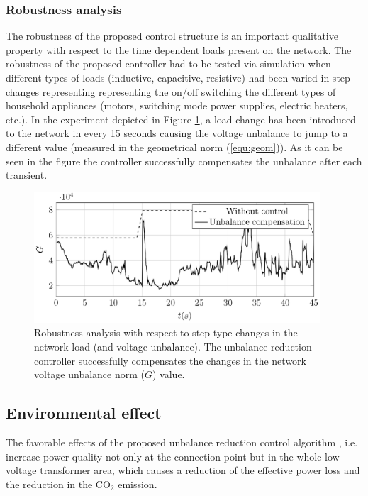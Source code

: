       \subsubsection{Robustness analysis}

            The robustness of the proposed control structure is an important qualitative property with respect to the time dependent loads present on the network. The robustness of the proposed controller had to be tested via simulation when different types of loads (inductive, capacitive, resistive) had been varied in step changes representing representing the on/off switching the different types of household appliances (motors, switching mode power supplies, electric heaters, etc.). In the experiment depicted in Figure \ref{fig:robustness}, a load change has been introduced to the network in every 15 seconds causing the voltage unbalance to jump to a different value (measured in the geometrical norm (\ref{equ:geom})). As it can be seen in the figure the controller successfully compensates the unbalance after each transient.

              \begin{figure}[ht]
            \centering
            \includegraphics[width=0.95\textwidth]{Unblance_EPS_Pics/UnbalRedComp_JCP-figure5.eps}
            \caption{Robustness analysis with respect to step type changes in the network load (and voltage unbalance). The unbalance reduction controller successfully compensates the changes in the network voltage unbalance norm ($G$) value.}
            \label{fig:robustness}
            \end{figure}

    \subsection{Environmental effect}

    The favorable effects of the proposed unbalance reduction control algorithm , i.e. increase power quality not only at the connection point but in the whole low voltage transformer area, which causes a reduction of the effective power loss and the reduction in the CO${}_2$ emission.

